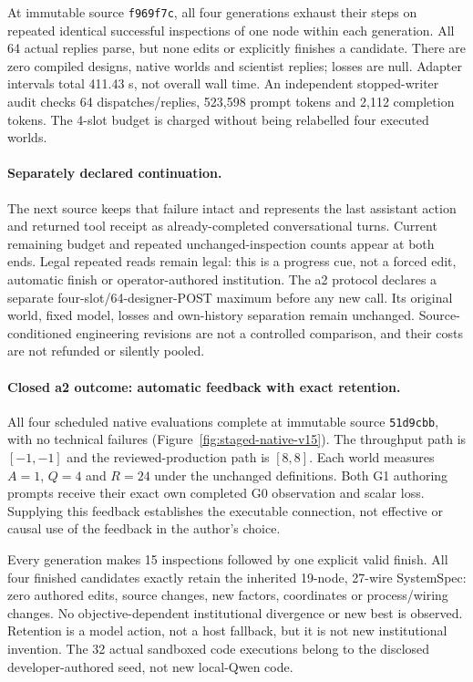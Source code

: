 At immutable source \texttt{f969f7c}, all four generations exhaust their
steps on repeated identical successful inspections of one node within each
generation. All 64 actual replies parse, but none edits or explicitly finishes
a candidate. There are zero compiled designs, native worlds and scientist
replies; losses are null. Adapter intervals total 411.43 s, not overall wall
time. An independent stopped-writer audit checks 64 dispatches/replies,
523,598 prompt tokens and 2,112 completion tokens. The 4-slot budget is
charged without being relabelled four executed worlds.

\paragraph{Separately declared continuation.}
The next source keeps that failure intact and represents the last assistant
action and returned tool receipt as already-completed conversational turns.
Current remaining budget and repeated unchanged-inspection counts appear at
both ends. Legal repeated reads remain legal: this is a progress cue, not
a forced edit, automatic finish or operator-authored institution. The a2
protocol declares a separate four-slot/64-designer-POST maximum before any
new call. Its original world, fixed model, losses and own-history separation
remain unchanged. Source-conditioned engineering revisions are not a
controlled comparison, and their costs are not refunded or silently pooled.

\paragraph{Closed a2 outcome: automatic feedback with exact retention.}
All four scheduled native evaluations complete at immutable source
\texttt{51d9cbb}, with no technical failures
(Figure~\ref{fig:staged-native-v15}). The throughput path is $[-1,-1]$ and
the reviewed-production path is $[8,8]$. Each world measures $A=1$, $Q=4$
and $R=24$ under the unchanged definitions. Both G1 authoring prompts receive
their exact own completed G0 observation and scalar loss. Supplying this
feedback establishes the executable connection, not effective or causal use
of the feedback in the author's choice.

Every generation makes 15 inspections followed by one explicit valid finish.
All four finished candidates exactly retain the inherited 19-node, 27-wire
SystemSpec: zero authored edits, source changes, new factors, coordinates or
process/wiring changes. No objective-dependent institutional divergence or
new best is observed. Retention is a model action, not a host fallback, but
it is not new institutional invention. The 32 actual sandboxed code executions
belong to the disclosed developer-authored seed, not new local-Qwen code.

